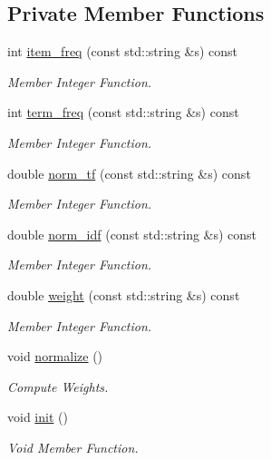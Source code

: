 \subsection*{Private Member Functions}
\begin{DoxyCompactItemize}
\item 
int \hyperlink{class_sentence_af3e48fa5d5776ae122b408191d67d327}{item\+\_\+freq} (const std\+::string \&s) const
\begin{DoxyCompactList}\small\item\em Member Integer Function. \end{DoxyCompactList}\item 
int \hyperlink{class_sentence_aa615a21b45de69ba4a1f0fa257a85ccd}{term\+\_\+freq} (const std\+::string \&s) const
\begin{DoxyCompactList}\small\item\em Member Integer Function. \end{DoxyCompactList}\item 
double \hyperlink{class_sentence_a28fab0061fe288f5ed66bdedf05eb82e}{norm\+\_\+tf} (const std\+::string \&s) const
\begin{DoxyCompactList}\small\item\em Member Integer Function. \end{DoxyCompactList}\item 
double \hyperlink{class_sentence_ac114a37a1f4c317f5141802d2d77b209}{norm\+\_\+idf} (const std\+::string \&s) const
\begin{DoxyCompactList}\small\item\em Member Integer Function. \end{DoxyCompactList}\item 
double \hyperlink{class_sentence_ac7084c1822710975f94ed8a30ac73c2c}{weight} (const std\+::string \&s) const
\begin{DoxyCompactList}\small\item\em Member Integer Function. \end{DoxyCompactList}\item 
void \hyperlink{class_sentence_a69d6f959ca6dfb72a73e8f35f9a12afa}{normalize} ()
\begin{DoxyCompactList}\small\item\em Compute Weights. \end{DoxyCompactList}\item 
void \hyperlink{class_sentence_ad450504df67b1a466288c1d7d1165813}{init} ()
\begin{DoxyCompactList}\small\item\em Void Member Function. \end{DoxyCompactList}\end{DoxyCompactItemize}
